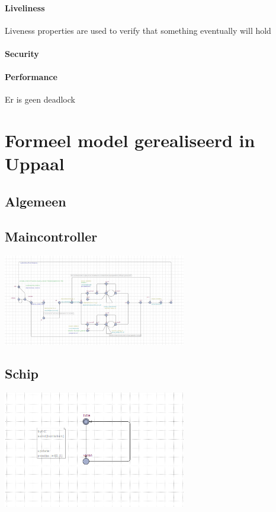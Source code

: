 \documentclass{article}
\begin{document}
	\paragraph{Liveliness}
	Liveness properties are used to verify that
	something eventually will hold
	\paragraph{Security}
	
	\paragraph{Performance}
	
	Er is geen deadlock
	

	
	
	
	\newpage
	\section{Formeel model gerealiseerd in Uppaal}
	
	\subsection{Algemeen}
	

	
	
		\subsection{Maincontroller}
	\includegraphics[width=8cm]{main.png} %
	\subsection{Schip}
	\includegraphics[width=8cm]{schip.png} %
\end{document}
